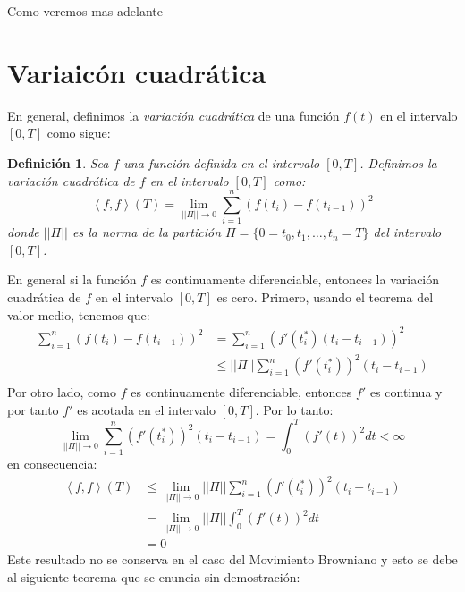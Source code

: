 \documentclass{extreport}
\theoremstyle{definicion}
\newtheorem{definition}{Definición}[chapter]
\theoremstyle{propiedad}
\theoremstyle{teorema}
\begin{document}
Como veremos mas adelante 

 \section{Variaicón cuadrática}

En general, definimos la \emph{variación cuadrática} de una función $f(t)$ en el intervalo $[0,T]$ como sigue:
\begin{definition}
    Sea $f$ una función definida en el intervalo $[0,T]$. Definimos la \emph{variación cuadrática} de $f$ en el intervalo $[0,T]$ como:
    \begin{equation}
        \left\langle f, f\right\rangle(T) = \lim_{||\Pi||\rightarrow 0}\sum_{i=1}^{n}\left(f(t_i) - f(t_{i-1})\right)^2
        \label{varquad:2}
    \end{equation}
    donde $||\Pi||$ es la norma de la partición $\Pi = \{0 = t_0, t_1, \ldots, t_n = T\}$ del intervalo $[0,T]$.
\end{definition}

En general si la función $f$ es continuamente diferenciable, entonces la variación cuadrática de $f$ en el intervalo $[0,T]$ es cero.
Primero, usando el teorema del valor medio, tenemos que:
\begin{align*}
    \sum_{i=1}^{n}\left(f(t_i) - f(t_{i-1})\right)^2  & = \sum_{i=1}^{n}\left(f'(t^*_i)(t_i-t_{i-1})\right)^2\\
                                                      & \leq ||\Pi||\sum_{i=1}^{n}\left(f'(t^*_i)\right)^2(t_i-t_{i-1})\\
\end{align*}
Por otro lado, como $f$ es continuamente diferenciable, entonces $f'$ es continua y por tanto $f'$ es acotada en el intervalo $[0,T]$. Por lo tanto:
$$
\lim_{||\Pi||\rightarrow 0}\sum_{i=1}^{n}\left(f'(t^*_i)\right)^2(t_i-t_{i-1}) = \int_0^T\left(f'(t)\right)^2dt < \infty
$$
en consecuencia:
\begin{align*}
    \left\langle f, f\right\rangle(T) & \leq \lim_{||\Pi||\rightarrow 0}||\Pi||\sum_{i=1}^{n}\left(f'(t^*_i)\right)^2(t_i-t_{i-1})\\
                                      & = \lim_{||\Pi||\rightarrow 0}||\Pi||\int_0^T\left(f'(t)\right)^2dt\\
                                      & = 0
\end{align*}
Este resultado no se conserva en el caso del Movimiento Browniano y esto se debe al siguiente teorema que se enuncia sin demostración:
\end{document}
